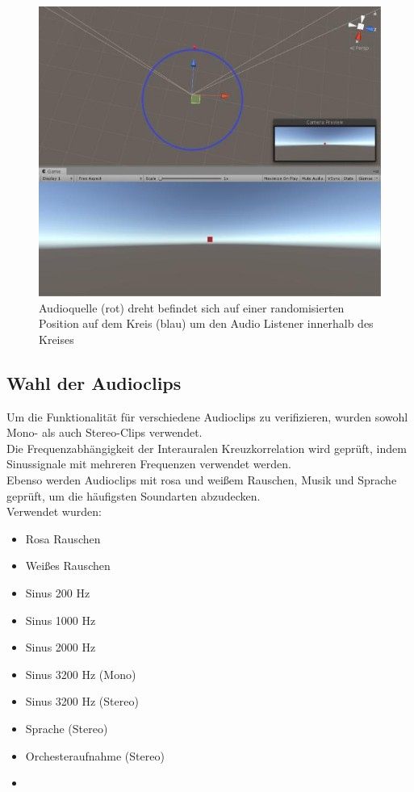 \documentclass[12pt,a4paper]{article}
\begin{document}
\begin{figure}[h!]
\centering
\includegraphics[scale=0.5]{setup1}
\caption{Audioquelle (rot) dreht befindet sich auf einer randomisierten Position auf dem Kreis (blau) um den Audio Listener innerhalb des Kreises}
\end{figure}

\subsection{Wahl der Audioclips}
Um die Funktionalität für verschiedene Audioclips zu verifizieren, wurden sowohl Mono- als auch Stereo-Clips verwendet.\\ 
Die Frequenzabhängigkeit der Interauralen Kreuzkorrelation wird geprüft, indem Sinussignale mit mehreren Frequenzen verwendet werden.\\ 
Ebenso werden Audioclips mit rosa und weißem Rauschen, Musik und Sprache geprüft, um die häufigsten Soundarten abzudecken.\\
\newpage
Verwendet wurden:
\begin{multicols}{2}
\begin{itemize}
\item Rosa Rauschen
\item Weißes Rauschen
\item Sinus 200 Hz
\item Sinus 1000 Hz
\item Sinus 2000 Hz
\item Sinus 3200 Hz (Mono)
\item Sinus 3200 Hz (Stereo)
\item Sprache (Stereo)
\item Orchesteraufnahme (Stereo)
\item[\vspace{\fill}]
\end{itemize}
\end{multicols}
\end{document}
